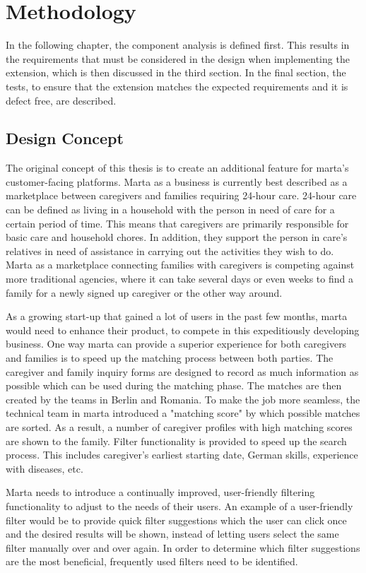 \newpage
\chapter{Methodology}
In the following chapter, the component analysis is defined first. This results in the requirements that must be considered in the design when implementing the extension, which is then discussed in the third section. In the final section, the tests, to ensure that the extension matches the expected requirements and it is defect free, are described.

\section{Design Concept}
The original concept of this thesis is to create an additional feature for marta's customer-facing platforms. Marta as a business is currently best described as a marketplace between caregivers and families requiring 24-hour care. 24-hour care can be defined as living in a household with the person in need of care for a certain period of time. This means that caregivers are primarily responsible for basic care and household chores. In addition, they support the person in care's relatives in need of assistance in carrying out the activities they wish to do. Marta as a marketplace connecting families with caregivers is competing against more traditional agencies, where it can take several days or even weeks to find a family for a newly signed up caregiver or the other way around.

As a growing start-up that gained a lot of users in the past few months, marta would need to enhance their product, to compete in this expeditiously developing business. One way marta can provide a superior experience for both caregivers and families is to speed up the matching process between both parties. The caregiver and family inquiry forms are designed to record as much information as possible which can be used during the matching phase. The matches are then created by the teams in Berlin and Romania. To make the job more seamless, the technical team in marta introduced a "matching score" by which possible matches are sorted. As a result, a number of caregiver profiles with high matching scores are shown to the family. Filter functionality is provided to speed up the search process. This includes caregiver's earliest starting date, German skills, experience with diseases, etc.

Marta needs to introduce a continually improved, user-friendly filtering functionality to adjust to the needs of their users. An example of a user-friendly filter would be to provide quick filter suggestions which the user can click once and the desired results will be shown, instead of letting users select the same filter manually over and over again. In order to determine which filter suggestions are the most beneficial, frequently used filters need to be identified.

